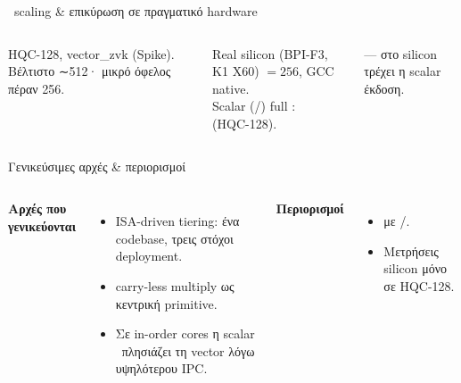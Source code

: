\documentclass[aspectratio=169,10pt]{beamer}
\begin{document}
\begin{frame}{\VLEN\ scaling \& επικύρωση σε πραγματικό hardware}
  \begin{columns}[T]
      \par\footnotesize\textcolor{neutral}{HQC-128, vector\_zvk (Spike). Βέλτιστο ∼512· μικρό όφελος πέραν 256.}
      \begin{block}{Real silicon (BPI-F3, K1 X60)}
        \VLEN $=256$, GCC native.\\[0.3em]
        Scalar (\Zbc/\Zbb) full \KEM:\\  (HQC-128).
      \end{block}
      \footnotesize {} — στο silicon τρέχει η scalar έκδοση.
  \end{columns}
\end{frame}


\begin{frame}{Γενικεύσιμες αρχές \& περιορισμοί}
  \begin{columns}[T]
      \textbf{Αρχές που γενικεύονται}
      \begin{itemize}
        \item ISA-driven tiering: ένα codebase, τρεις στόχοι deployment.
        \item carry-less multiply ως κεντρική primitive.
        \item Σε in-order cores η scalar \Zbc\ πλησιάζει τη vector λόγω υψηλότερου IPC.
      \end{itemize}
      \textbf{Περιορισμοί}
      \begin{itemize}
        \item {} με \Zvbc/\Zvbb.
        \item Μετρήσεις silicon μόνο σε HQC-128.
      \end{itemize}
  \end{columns}
\end{frame}
\end{document}
